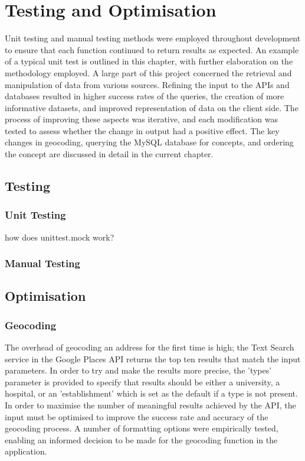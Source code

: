 \documentclass[Report.tex]{subfiles}
\begin{document}
\chapter{Testing and Optimisation}
Unit testing and manual testing methods were employed throughout development to ensure that each function continued to return results as expected. An example of a typical unit test is outlined in this chapter, with further elaboration on the methodology employed. A large part of this project concerned the retrieval and manipulation of data from various sources. Refining the input to the APIs and databases resulted in higher success rates of the queries, the creation of more informative datasets, and improved representation of data on the client side. The process of improving these aspects was iterative, and each modification was tested to assess whether the change in output had a positive effect. The key changes in geocoding, querying the MySQL database for concepts, and ordering the concept are discussed in detail in the current chapter.
\section{Testing}
\subsection{Unit Testing}
how does unittest.mock work?
\subsection{Manual Testing}
\section{Optimisation}
\subsection{Geocoding}
The overhead of geocoding an address for the first time is high; the Text Search service in the Google Places API returns the top ten results that match the input parameters. In order to try and make the results more precise, the 'types' parameter is provided to specify that results should be either a university, a hospital, or an 'establishment' which is set as the default if a type is not present. In order to maximise the number of meaningful results achieved by the API, the input must be optimised to improve the success rate and accuracy of the geocoding process. A number of formatting options were empirically tested, enabling an informed decision to be made for the geocoding function in the application.\newline
\end{document}

